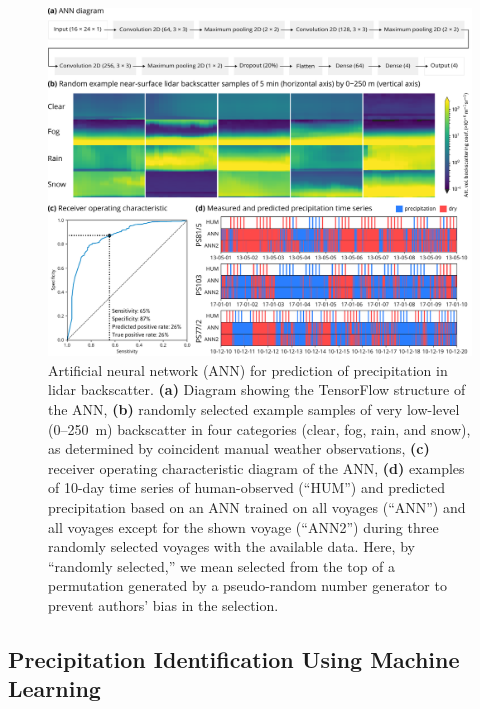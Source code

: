 \documentclass[draft]{agujournal2019}
\begin{document}
\begin{figure}[b!]
\centering
\includegraphics[width=\textwidth]{img/ann.pdf}
\caption{
Artificial neural network (ANN) for prediction of precipitation in lidar backscatter. \textbf{(a)} Diagram showing the TensorFlow structure of the ANN, \textbf{(b)} randomly selected example samples of very low-level (0–250~m) backscatter in four categories (clear, fog, rain, and snow), as determined by coincident manual weather observations, \textbf{(c)} receiver operating characteristic diagram of the ANN, \textbf{(d)} examples of 10-day time series of human-observed (``HUM'') and predicted precipitation based on an ANN trained on all voyages (``ANN'') and all voyages except for the shown voyage (``ANN2'') during three randomly selected voyages with the available data. Here, by ``randomly selected,'' we mean selected from the top of a permutation generated by a pseudo-random number generator to prevent authors' bias in the selection.
}
\label{fig:ann}
\end{figure}

\subsection{Precipitation Identification Using Machine Learning}
\label{sec:ann}
\end{document}

